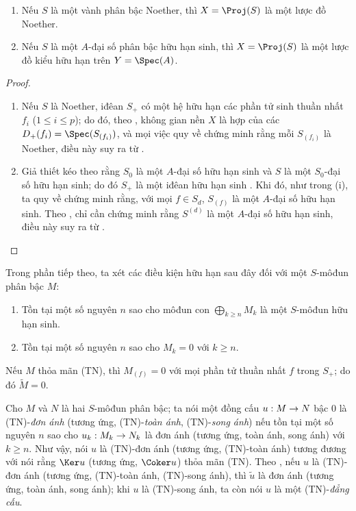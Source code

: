 \documentclass[oneside,10pt]{amsart}
\makeatletter
\renewcommand{\leq}{\leqslant}
\renewcommand{\geq}{\geqslant}
\newcommand{\ega@arrow}[2]{\mathchoice{#1}{#2}{#2}{#2}}
\renewcommand{\to}{\ega@arrow{\longrightarrow}{\rightarrow}}
\newcommand{\oldpage}[2][]{\marginnote{\normalfont\footnotesize\textbf{#1}~|~#2}\ignorespaces}
\let\EGAOriginalLabel\label
\renewcommand{\label}[1]{\phantomsection\EGAOriginalLabel{#1}}
\makeatother
\begin{document}
\begin{proposition}[2.7.1]
\label{II.2.7.1}
\begin{enumerate}
  \item[{\rm(i)}] Nếu $S$ là một vành phân bậc Noether, thì $X=\Proj(S)$ là một lược đồ Noether.
  \item[{\rm(ii)}] Nếu $S$ là một $A$-đại số phân bậc hữu hạn sinh, thì $X=\Proj(S)$ là một lược đồ kiểu hữu hạn trên $Y=\Spec(A)$.
\end{enumerate}
\end{proposition}
\oldpage[II]{39}
\begin{proof}
\medskip\noindent
\begin{enumerate}
  \item[{\rm(i)}] Nếu $S$ là Noether, iđêan $S_+$ có một hệ hữu hạn các phần tử sinh thuần nhất $f_i$ ($1\leq i\leq p$); do đó, theo , không gian nền $X$ là hợp của các $D_+(f_i)=\Spec(S_{(f_i)})$, và mọi việc quy về chứng minh rằng mỗi $S_{(f_i)}$ là Noether, điều này suy ra từ .
  \item[{\rm(ii)}] Giả thiết kéo theo rằng $S_0$ là một $A$-đại số hữu hạn sinh và $S$ là một $S_0$-đại số hữu hạn sinh; do đó $S_+$ là một iđêan hữu hạn sinh .
    Khi đó, như trong (i), ta quy về chứng minh rằng, với mọi $f\in S_d$, $S_{(f)}$ là một $A$-đại số hữu hạn sinh.
    Theo , chỉ cần chứng minh rằng $S^{(d)}$ là một $A$-đại số hữu hạn sinh, điều này suy ra từ .
\end{enumerate}
\end{proof}

\begin{env}[2.7.2]
\label{II.2.7.2}
Trong phần tiếp theo, ta xét các điều kiện hữu hạn sau đây đối với một $S$-môđun phân bậc $M$:
\begin{enumerate}
  \item[{\rm(TF)}] Tồn tại một số nguyên $n$ sao cho môđun con $\bigoplus_{k\geq n}M_k$ là một $S$-môđun hữu hạn sinh.
  \item[{\rm(TN)}] Tồn tại một số nguyên $n$ sao cho $M_k=0$ với $k\geq n$.
\end{enumerate}

Nếu $M$ thỏa mãn (TN), thì $M_{(f)}=0$ với mọi phần tử thuần nhất $f$ trong $S_+$; do đó $\widetilde{M}=0$.

Cho $M$ và $N$ là hai $S$-môđun phân bậc; ta nói một đồng cấu $u:M\to N$ bậc $0$ là (TN)-\emph{đơn ánh} (tương ứng, (TN)-\emph{toàn ánh}, (TN)-\emph{song ánh}) nếu tồn tại một số nguyên $n$ sao cho $u_k:M_k\to N_k$ là đơn ánh (tương ứng, toàn ánh, song ánh) với $k\geq n$.
Như vậy, nói $u$ là (TN)-đơn ánh (tương ứng, (TN)-toàn ánh) tương đương với nói rằng $\Ker u$ (tương ứng, $\Coker u$) thỏa mãn (TN).
Theo , nếu $u$ là (TN)-đơn ánh (tương ứng, (TN)-toàn ánh, (TN)-song ánh), thì $\widetilde{u}$ là đơn ánh (tương ứng, toàn ánh, song ánh); khi $u$ là (TN)-song ánh, ta còn nói $u$ là một (TN)-\emph{đẳng cấu}.
\end{env}
\end{document}

